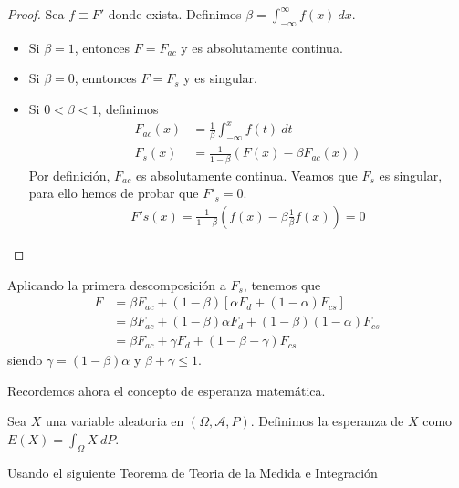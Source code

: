 \begin{proof}
Sea $f \equiv F'$ donde exista. Definimos $\beta = \int_{-\infty}^{\infty} f(x) \ dx$.
\begin{itemize}
    \item Si $\beta = 1$, entonces $F = F_{ac}$ y es absolutamente continua.
    \item Si $\beta = 0$, enntonces $F = F_s$ y es singular.
    \item Si $0 < \beta < 1$, definimos
    \begin{align*}
        F_{ac}(x) &= \frac{1}{\beta} \int_{-\infty}^{x} f(t) \ dt \\
        F_s(x) &= \frac{1}{1-\beta}(F(x) - \beta F_{ac}(x))
    \end{align*}
    Por definición, $F_{ac}$ es absolutamente continua. Veamos que $F_s$ es singular, para ello hemos de probar que $F'_s = 0$.
    \begin{align*}
        F's(x) = \frac{1}{1-\beta}\left(f(x) - \beta \frac{1}{\beta} f(x)\right) = 0
    \end{align*}
\end{itemize}
\end{proof}

\begin{obs}
Aplicando la primera descomposición a $F_s$, tenemos que
\begin{align*}
    F &= \beta F_{ac} + (1-\beta)[\alpha F_d + (1-\alpha)F_{cs}] \\
    &= \beta F_{ac} + (1-\beta)\alpha F_d + (1-\beta)(1-\alpha)F_{cs} \\
    &= \beta F_{ac} + \gamma F_d + (1-\beta-\gamma)F_{cs}
\end{align*}
siendo $\gamma = (1-\beta)\alpha$ y $\beta + \gamma \leq 1$.
\end{obs}

\noindent Recordemos ahora el concepto de esperanza matemática.

\begin{defi}
    Sea $X$ una variable aleatoria en $(\Omega, \mathcal{A}, P)$. Definimos la esperanza de $X$ como $E(X) = \int_{\Omega} X \ dP$.
\end{defi}

Usando el siguiente Teorema de Teoria de la Medida e Integración

